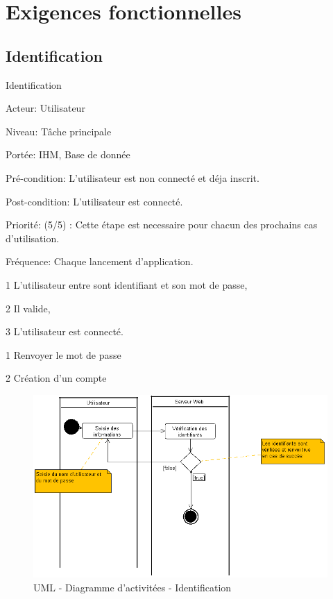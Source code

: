 \chapter{Exigences fonctionnelles}

\section{Identification}

\begin{usecase}{Identification}

\begin{information}
\item[Acteur: ] Utilisateur
\item[Niveau:] Tâche principale
\item[Portée:] IHM, Base de donnée 
\item[Pré-condition:] L'utilisateur est non connecté et déja inscrit. 
\item[Post-condition:] L'utilisateur est connecté. 
\item[Priorité:] (5/5) : Cette étape est necessaire pour chacun des prochains cas d'utilisation.
\item[Fréquence:] Chaque lancement d'application.	
\end{information}	

\begin{scenario}
\item[1] L'utilisateur entre sont identifiant et son mot de passe,
\item[2] Il valide,
\item[3] L'utilisateur est connecté. 
\end{scenario}	

\begin{extension}
	\item[1]Renvoyer le mot de passe
	\item[2]Création d'un compte
\end{extension}
\end{usecase}

\begin{figure}[H]
  \begin{center}
  \includegraphics[scale=0.5]{diagrams/ActivityIdent.png}
  \caption{UML - Diagramme d'activitées - Identification}
  \label{fig:Architecture Generale}
  \end{center}
  \end{figure}

